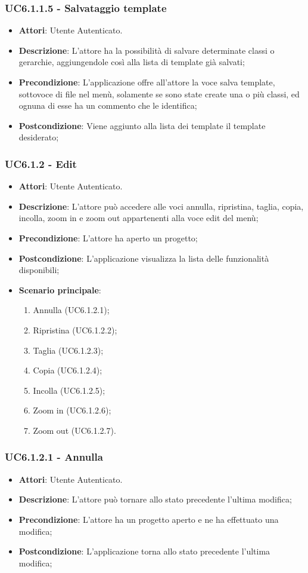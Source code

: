 \subsubsection{UC6.1.1.5 - Salvataggio template} 
\label{sssec:UC6.1.1.5} 
\begin{itemize} 
\item \textbf{Attori}: Utente Autenticato.
\item \textbf{Descrizione}: L’attore ha la possibilità di salvare determinate classi o gerarchie, aggiungendole così alla lista di template già salvati;
\item \textbf{Precondizione}: L’applicazione offre all’attore la voce salva template, sottovoce di file nel menù, solamente se sono state create una o più classi, ed ognuna di esse ha un commento che le identifica;
\item \textbf{Postcondizione}: Viene aggiunto alla lista dei template il template desiderato;
\end{itemize} 
\subsubsection{UC6.1.2 - Edit} 
\label{sssec:UC6.1.2} 
\begin{itemize} 
\item \textbf{Attori}: Utente Autenticato.
\item \textbf{Descrizione}: L’attore può accedere alle voci annulla, ripristina, taglia, copia, incolla, zoom in e zoom out appartenenti alla voce edit del menù;
\item \textbf{Precondizione}: L'attore ha aperto un progetto;
\item \textbf{Postcondizione}: L’applicazione visualizza la lista delle funzionalità disponibili;
\item \textbf{Scenario principale}: \begin{enumerate}\item Annulla (UC6.1.2.1);\item Ripristina (UC6.1.2.2);\item Taglia (UC6.1.2.3);\item Copia (UC6.1.2.4);\item Incolla (UC6.1.2.5);\item Zoom in (UC6.1.2.6);\item Zoom out (UC6.1.2.7). 
 \end{enumerate}
\end{itemize} 
\subsubsection{UC6.1.2.1 - Annulla} 
\label{sssec:UC6.1.2.1} 
\begin{itemize} 
\item \textbf{Attori}: Utente Autenticato.
\item \textbf{Descrizione}: L’attore può tornare allo stato precedente l’ultima modifica;
\item \textbf{Precondizione}: L'attore ha un progetto aperto e ne ha effettuato una modifica;
\item \textbf{Postcondizione}: L’applicazione torna allo stato precedente l’ultima modifica;
\end{itemize} 
